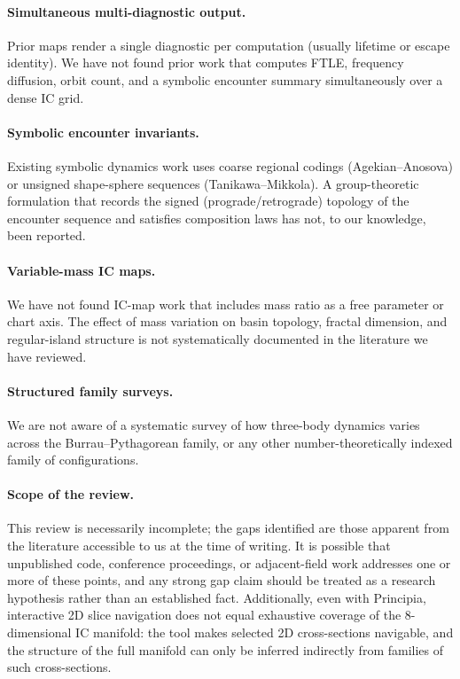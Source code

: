 \documentclass[11pt,a4paper]{article}
\begin{document}
\paragraph{Simultaneous multi-diagnostic output.}
Prior maps render a single diagnostic per computation (usually lifetime or escape identity).
We have not found prior work that computes FTLE, frequency diffusion, orbit count, and a
symbolic encounter summary simultaneously over a dense IC grid.

\paragraph{Symbolic encounter invariants.}
Existing symbolic dynamics work uses coarse regional codings (Agekian--Anosova) or unsigned
shape-sphere sequences (Tanikawa--Mikkola).  A group-theoretic formulation that records the
signed (prograde/retrograde) topology of the encounter sequence and satisfies composition laws
has not, to our knowledge, been reported.

\paragraph{Variable-mass IC maps.}
We have not found IC-map work that includes mass ratio as a free parameter or chart axis.
The effect of mass variation on basin topology, fractal dimension, and regular-island structure
is not systematically documented in the literature we have reviewed.

\paragraph{Structured family surveys.}
We are not aware of a systematic survey of how three-body dynamics varies across the
Burrau--Pythagorean family, or any other number-theoretically indexed family of configurations.

\paragraph{Scope of the review.}
This review is necessarily incomplete; the gaps identified are those apparent from the
literature accessible to us at the time of writing.  It is possible that unpublished code,
conference proceedings, or adjacent-field work addresses one or more of these points, and any
strong gap claim should be treated as a research hypothesis rather than an established fact.
Additionally, even with Principia, interactive 2D slice navigation does not equal exhaustive
coverage of the 8-dimensional IC manifold: the tool makes selected 2D cross-sections navigable,
and the structure of the full manifold can only be inferred indirectly from families of such
cross-sections.
\end{document}

